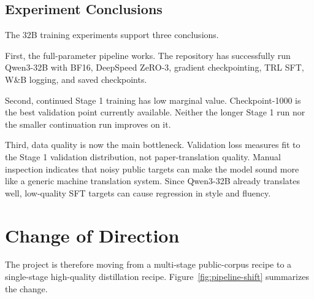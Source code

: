 \documentclass{article}
\begin{document}
\subsection{Experiment Conclusions}

The 32B training experiments support three conclusions.

First, the full-parameter pipeline works. The repository has successfully run Qwen3-32B with BF16, DeepSpeed ZeRO-3, gradient checkpointing, TRL SFT, W\&B logging, and saved checkpoints.

Second, continued Stage 1 training has low marginal value. Checkpoint-1000 is the best validation point currently available. Neither the longer Stage 1 run nor the smaller continuation run improves on it.

Third, data quality is now the main bottleneck. Validation loss measures fit to the Stage 1 validation distribution, not paper-translation quality. Manual inspection indicates that noisy public targets can make the model sound more like a generic machine translation system. Since Qwen3-32B already translates well, low-quality SFT targets can cause regression in style and fluency.

\section{Change of Direction}

The project is therefore moving from a multi-stage public-corpus recipe to a single-stage high-quality distillation recipe. Figure~\ref{fig:pipeline-shift} summarizes the change.
\end{document}
